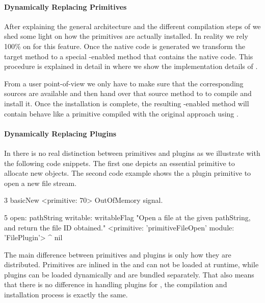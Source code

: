 \paragraph{Dynamically Replacing Primitives}
After explaining the general architecture and the different compilation steps of \WF we shed some light on how the primitives are actually installed.
In reality we rely 100\% on \B for this feature.
Once the native code is generated we transform the target method to a special \B-enabled method that contains the native code.
This procedure is explained in detail in  where we show the implementation details of \B.

From a user point-of-view we only have to make sure that the corresponding \Slang sources are available and then hand over that source method to \WF to compile and install it.
Once the installation is complete, the resulting \B-enabled method will contain behave like a \Slang primitive compiled with the original approach using \GCC.

\paragraph{Dynamically Replacing Plugins}
In \PH there is no real distinction between primitives and plugins as we illustrate with the following code snippets.
The first one depicts an essential primitive to allocate new objects.
The second code example shows the a plugin primitive to open a new file stream.
%
\begin{stcode}[
	caption={\ttt{Object>>\#basicNew} Primitive},
	label={lst:validation-basicnew}]{3}
basicNew
  <primitive: 70>
  OutOfMemory signal.
\end{stcode}
%
\begin{stcode}[caption={\ttt{FilePlugin>>\#open:writeable:} Plugin Primitive}]{5}
open: pathString writable: writableFlag
  "Open a file at the given pathString, and return
   the file ID obtained."
  <primitive: 'primitiveFileOpen' module: 'FilePlugin'>
  ^ nil
\end{stcode}
%
The main difference between primitives and plugins is only how they are distributed.
Primitives are inlined in the \VM and can not be loaded at runtime, while plugins can be loaded dynamically and are bundled separately.
That also means that there is no difference in handling plugins for \WF, the compilation and installation process is exactly the same.


